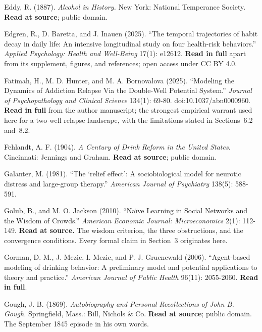 \documentclass[11pt,a4paper]{article}
\begin{document}
\begin{list}{}{\setlength{\leftmargin}{1.5em}\setlength{\itemindent}{-1.5em}\setlength{\itemsep}{2pt}}
\item Eddy, R. (1887). \textit{Alcohol in History.} New York: National Temperance Society. \textbf{Read at source}; public domain.

\item Edgren, R., D. Baretta, and J. Inauen (2025). ``The temporal trajectories of habit decay in daily life: An intensive longitudinal study on four health-risk behaviors.'' \textit{Applied Psychology: Health and Well-Being} 17(1): e12612. \textbf{Read in full} apart from its supplement, figures, and references; open access under CC BY 4.0.

\item Fatimah, H., M. D. Hunter, and M. A. Bornovalova (2025). ``Modeling the Dynamics of Addiction Relapse Via the Double-Well Potential System.'' \textit{Journal of Psychopathology and Clinical Science} 134(1): 69-80. doi:10.1037/abn0000960. \textbf{Read in full} from the author manuscript; the strongest empirical warrant used here for a two-well relapse landscape, with the limitations stated in Sections~6.2 and~8.2.

\item Fehlandt, A. F. (1904). \textit{A Century of Drink Reform in the United States.} Cincinnati: Jennings and Graham. \textbf{Read at source}; public domain.

\item Galanter, M. (1981). ``The `relief effect': A sociobiological model for neurotic distress and large-group therapy.'' \textit{American Journal of Psychiatry} 138(5): 588-591.

\item Golub, B., and M. O. Jackson (2010). ``Na\"ive Learning in Social Networks and the Wisdom of Crowds.'' \textit{American Economic Journal: Microeconomics} 2(1): 112-149. \textbf{Read at source.} The wisdom criterion, the three obstructions, and the convergence conditions. Every formal claim in Section~3 originates here.

\item Gorman, D. M., J. Mezic, I. Mezic, and P. J. Gruenewald (2006). ``Agent-based modeling of drinking behavior: A preliminary model and potential applications to theory and practice.'' \textit{American Journal of Public Health} 96(11): 2055-2060. \textbf{Read in full}.

\item Gough, J. B. (1869). \textit{Autobiography and Personal Recollections of John B. Gough.} Springfield, Mass.: Bill, Nichols \& Co. \textbf{Read at source}; public domain. The September 1845 episode in his own words.


\end{list}
\end{document}
